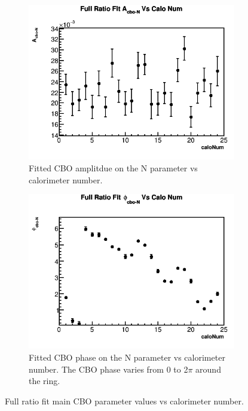 \begin{figure}[h]
	    \vspace{4mm}
	    \begin{subfigure}[t]{0.4\textwidth}
		    \centering
			\includegraphics[width=\textwidth]{RatioCBOFit_A_cbo-N_Vs_Calo_Canv}
		    \caption{Fitted CBO amplitdue on the N parameter vs calorimeter number.}
		\label{subfig:CaloNcboAmp}
	    \end{subfigure}
	    \hspace{4mm}
	    \begin{subfigure}[t]{0.4\textwidth}
		    \centering
			\includegraphics[width=\textwidth]{RatioCBOFit_phi_cbo-N_Vs_Calo_Canv}
		    \caption{Fitted CBO phase on the N parameter vs calorimeter number. The CBO phase varies from 0 to 2$\pi$ around the ring.}
		\label{subfig:CaloNcboPhase}
	    \end{subfigure}%
	\caption[PerCaloPlotsCBO]{Full ratio fit main CBO parameter values vs calorimeter number.}
	\label{fig:PerCaloPlotsCBO}
	\end{figure}

